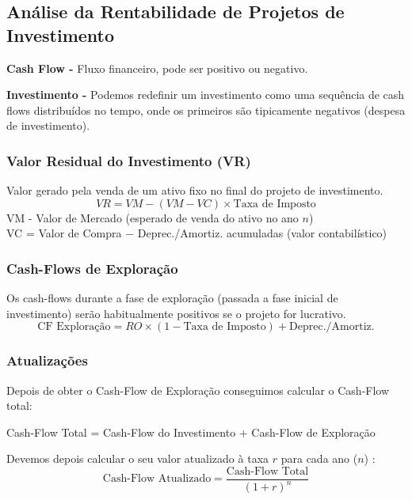\documentclass[11pt]{article}
\begin{document}
\subsection{Análise da Rentabilidade de Projetos de Investimento}

\textbf{Cash Flow -} Fluxo financeiro, pode ser positivo ou negativo.

\textbf{Investimento -} Podemos redefinir um investimento como uma sequência de cash flows distribuídos no tempo, onde os primeiros são tipicamente negativos (despesa de investimento).

\subsubsection{Valor Residual do Investimento (VR)}

Valor gerado pela venda de um ativo fixo no final do projeto de investimento.
\begin{equation*}
    VR = VM - (VM - VC) \times \text{Taxa de Imposto}
\end{equation*}
VM - Valor de Mercado (esperado de venda do ativo no ano $n$) \\
VC = Valor de Compra $-$ Deprec./Amortiz. acumuladas (valor contabilístico)

\subsubsection{Cash-Flows de Exploração}

Os cash-flows durante a fase de exploração (passada a fase inicial de investimento) serão habitualmente positivos se o projeto for lucrativo.
\begin{equation*}
    \text{CF Exploração} =
    RO \times (1 - \text{Taxa de Imposto}) + \text{Deprec./Amortiz.}
\end{equation*}

\subsubsection{Atualizações}

Depois de obter o Cash-Flow de Exploração conseguimos calcular o Cash-Flow total:
\begin{center}
    Cash-Flow Total = Cash-Flow do Investimento + Cash-Flow de Exploração
\end{center}

Devemos depois calcular o seu valor atualizado à taxa $r$ para cada ano ($n$) :
\begin{equation*}
    \text{Cash-Flow Atualizado} = \frac{\text{Cash-Flow Total}}{(1+r)^n}
\end{equation*}
\end{document}
